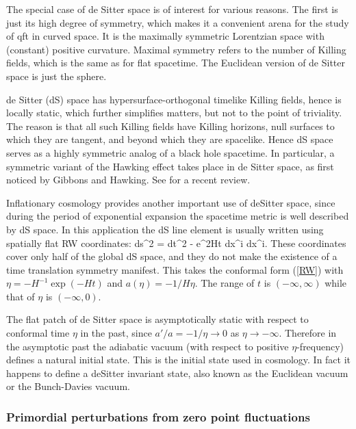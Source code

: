 \documentclass[12pt]{article}
\begin{document}
The special case of de Sitter space is of interest
for various reasons. The first is just its high degree of
symmetry, which makes it a convenient arena for the study
of qft in curved space.  It is the maximally symmetric
Lorentzian space with  (constant) positive curvature.
Maximal symmetry  refers to the number of Killing fields,
which is  the same as for flat spacetime. The Euclidean
version of de Sitter space is just the sphere. 

de Sitter (dS) space has hypersurface-orthogonal 
timelike Killing fields, hence is locally
static, which further simplifies matters, but not to the
point of triviality. The reason is that all such Killing
fields have Killing horizons, null surfaces to which they
are tangent, and beyond which they are spacelike. Hence dS
space serves as a highly symmetric analog of a black hole
spacetime. In particular, a symmetric variant of the
Hawking effect takes place in de Sitter space, as first
noticed by Gibbons and Hawking\cite{GH}. See \cite{AndydS}
for a recent review.

Inflationary cosmology provides another important use of
deSitter space, since during the period of exponential
expansion the spacetime metric is well described by dS
space. In this application the dS line element is usually
written using spatially flat RW coordinates:
%
\beq ds^2 = dt^2 - e^{2Ht} dx^i dx^i. \eeq
%
These coordinates cover only half of the global dS space, and they do not make
the existence of a 
time translation symmetry manifest. This takes the conformal form (\ref{RW}) with $\eta= -H^{-1}\exp(-Ht)$ and $a(\eta) = -1/H\eta$. The range of $t$ is $(-\infty,\infty)$ while that of $\eta$ is 
$(-\infty,0)$.

The flat patch of de Sitter space is 
asymptotically static with respect to 
conformal time $\eta$
in the past, since 
$a'/a=-1/\eta\rightarrow0$ as
$\eta\rightarrow -\infty$.
Therefore in the asymptotic past the adiabatic vacuum 
(with respect to positive $\eta$-frequency) defines a
natural initial state.
This is the initial state used in cosmology. In fact it
happens to define a deSitter invariant state, also
known as the Euclidean vacuum or the Bunch-Davies vacuum.


\subsubsection{Primordial perturbations from zero point fluctuations}
\label{primalpert}
\end{document}
